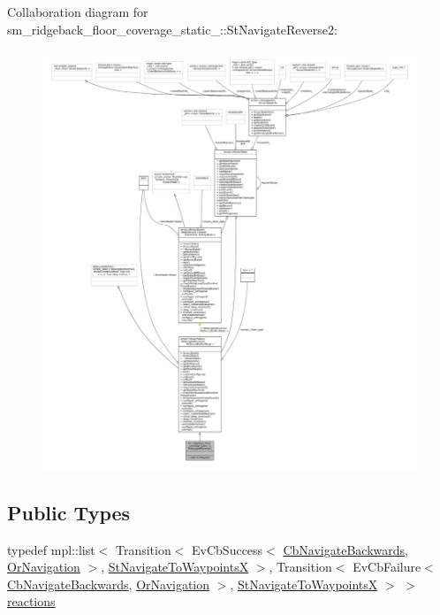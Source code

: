 Collaboration diagram for sm\+\_\+ridgeback\+\_\+floor\+\_\+coverage\+\_\+static\+\_\+:\+:St\+Navigate\+Reverse2\+:
\nopagebreak
\begin{figure}[H]
\begin{center}
\leavevmode
\includegraphics[width=350pt]{structsm__ridgeback__floor__coverage__static__1_1_1StNavigateReverse2__coll__graph}
\end{center}
\end{figure}
\subsection*{Public Types}
\begin{DoxyCompactItemize}
\item 
typedef mpl\+::list$<$ Transition$<$ Ev\+Cb\+Success$<$ \hyperlink{classcl__move__base__z_1_1CbNavigateBackwards}{Cb\+Navigate\+Backwards}, \hyperlink{classsm__ridgeback__floor__coverage__static__1_1_1OrNavigation}{Or\+Navigation} $>$, \hyperlink{structsm__ridgeback__floor__coverage__static__1_1_1StNavigateToWaypointsX}{St\+Navigate\+To\+WaypointsX} $>$, Transition$<$ Ev\+Cb\+Failure$<$ \hyperlink{classcl__move__base__z_1_1CbNavigateBackwards}{Cb\+Navigate\+Backwards}, \hyperlink{classsm__ridgeback__floor__coverage__static__1_1_1OrNavigation}{Or\+Navigation} $>$, \hyperlink{structsm__ridgeback__floor__coverage__static__1_1_1StNavigateToWaypointsX}{St\+Navigate\+To\+WaypointsX} $>$ $>$ \hyperlink{structsm__ridgeback__floor__coverage__static__1_1_1StNavigateReverse2_af8b306f6a2285c4c25c7e68e823ebaad}{reactions}
\end{DoxyCompactItemize}
